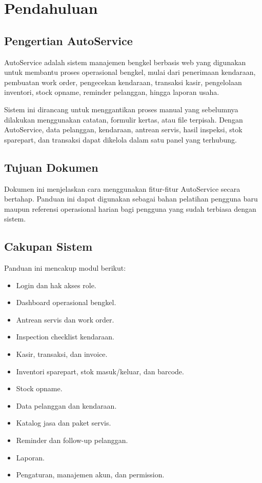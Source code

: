 \documentclass[12pt,a4paper]{report}
\begin{document}
\chapter{Pendahuluan}

\section{Pengertian AutoService}
AutoService adalah sistem manajemen bengkel berbasis web yang digunakan untuk membantu proses operasional bengkel, mulai dari penerimaan kendaraan, pembuatan work order, pengecekan kendaraan, transaksi kasir, pengelolaan inventori, stock opname, reminder pelanggan, hingga laporan usaha.

Sistem ini dirancang untuk menggantikan proses manual yang sebelumnya dilakukan menggunakan catatan, formulir kertas, atau file terpisah. Dengan AutoService, data pelanggan, kendaraan, antrean servis, hasil inspeksi, stok sparepart, dan transaksi dapat dikelola dalam satu panel yang terhubung.

\section{Tujuan Dokumen}
Dokumen ini menjelaskan cara menggunakan fitur-fitur AutoService secara bertahap. Panduan ini dapat digunakan sebagai bahan pelatihan pengguna baru maupun referensi operasional harian bagi pengguna yang sudah terbiasa dengan sistem.

\section{Cakupan Sistem}
Panduan ini mencakup modul berikut:
\begin{itemize}
    \item Login dan hak akses role.
    \item Dashboard operasional bengkel.
    \item Antrean servis dan work order.
    \item Inspection checklist kendaraan.
    \item Kasir, transaksi, dan invoice.
    \item Inventori sparepart, stok masuk/keluar, dan barcode.
    \item Stock opname.
    \item Data pelanggan dan kendaraan.
    \item Katalog jasa dan paket servis.
    \item Reminder dan follow-up pelanggan.
    \item Laporan.
    \item Pengaturan, manajemen akun, dan permission.
\end{itemize}
\end{document}
